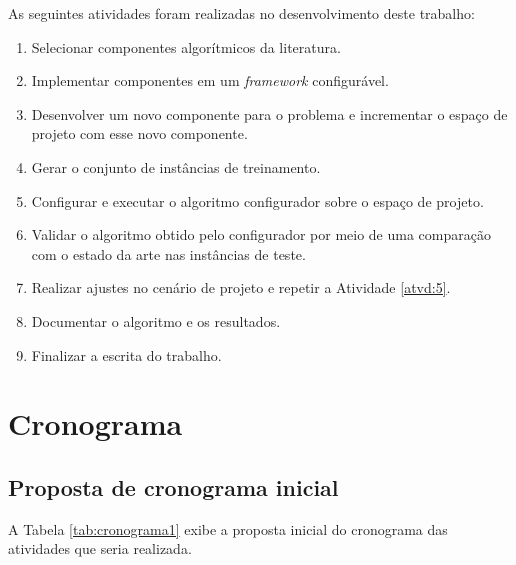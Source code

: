 As seguintes atividades foram realizadas no desenvolvimento deste trabalho:

\begin{enumerate}
    \item Selecionar componentes algorítmicos da literatura.
    \item Implementar componentes em um \textit{framework} configurável.
    \item Desenvolver um novo componente para o problema e incrementar o espaço de projeto com esse novo componente.
    \item Gerar o conjunto de instâncias de treinamento.
    \item Configurar e executar o algoritmo configurador sobre o espaço de projeto. \label{atvd:5}
    \item Validar o algoritmo obtido pelo configurador por meio de uma comparação com o estado da arte nas instâncias de teste.
    \item Realizar ajustes no cenário de projeto e repetir a Atividade \ref{atvd:5}.
    \item Documentar o algoritmo e os resultados.
    \item Finalizar a escrita do trabalho.
    
\end{enumerate}

\section{Cronograma}

\subsection{Proposta de cronograma inicial}

A Tabela \ref{tab:cronograma1} exibe a proposta inicial do cronograma das atividades que seria realizada.

